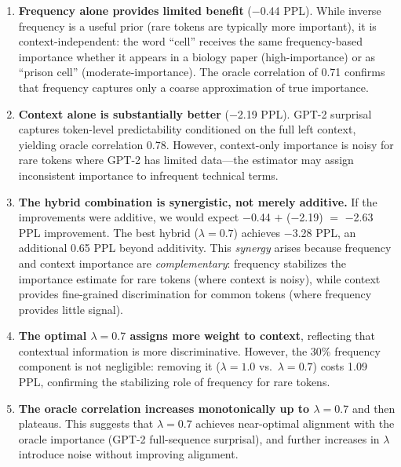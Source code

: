 \begin{enumerate}[leftmargin=*,itemsep=2pt]
    \item \textbf{Frequency alone provides limited benefit} ($-$0.44 PPL). While inverse frequency is a useful prior (rare tokens are typically more important), it is context-independent: the word ``cell'' receives the same frequency-based importance whether it appears in a biology paper (high-importance) or as ``prison cell'' (moderate-importance). The oracle correlation of 0.71 confirms that frequency captures only a coarse approximation of true importance.
    
    \item \textbf{Context alone is substantially better} ($-$2.19 PPL). GPT-2 surprisal captures token-level predictability conditioned on the full left context, yielding oracle correlation 0.78. However, context-only importance is noisy for rare tokens where GPT-2 has limited data---the estimator may assign inconsistent importance to infrequent technical terms.
    
    \item \textbf{The hybrid combination is synergistic, not merely additive.} If the improvements were additive, we would expect $-$0.44 $+$ ($-$2.19) $=$ $-$2.63 PPL improvement. The best hybrid ($\lambda = 0.7$) achieves $-$3.28 PPL, an additional 0.65 PPL beyond additivity. This \emph{synergy} arises because frequency and context importance are \emph{complementary}: frequency stabilizes the importance estimate for rare tokens (where context is noisy), while context provides fine-grained discrimination for common tokens (where frequency provides little signal).
    
    \item \textbf{The optimal $\lambda = 0.7$ assigns more weight to context}, reflecting that contextual information is more discriminative. However, the 30\% frequency component is not negligible: removing it ($\lambda = 1.0$ vs.\ $\lambda = 0.7$) costs 1.09 PPL, confirming the stabilizing role of frequency for rare tokens.
    
    \item \textbf{The oracle correlation increases monotonically up to $\lambda = 0.7$} and then plateaus. This suggests that $\lambda = 0.7$ achieves near-optimal alignment with the oracle importance (GPT-2 full-sequence surprisal), and further increases in $\lambda$ introduce noise without improving alignment.
\end{enumerate}

